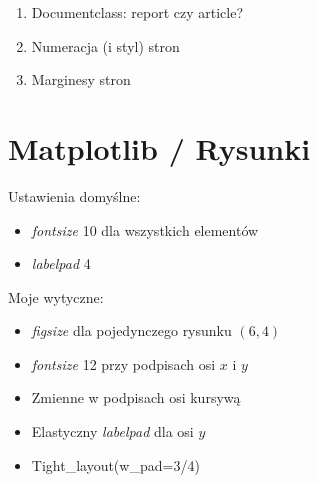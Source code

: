 \documentclass[12pt,a4paper,oneside]{book}
\theoremstyle{definition}
\begin{document}
\begin{enumerate}
\item Documentclass: report czy article?
\item Numeracja (i styl) stron
\item Marginesy stron
\end{enumerate}

\section{Matplotlib / Rysunki}

Ustawienia domyślne:
\begin{itemize}
	\item \textit{fontsize} 10 dla wszystkich elementów
	\item \textit{labelpad} 4
\end{itemize}
Moje wytyczne:
\begin{itemize}
	\item \textit{figsize} dla pojedynczego rysunku $(6, 4)$
	\item \textit{fontsize} 12 przy podpisach osi $x$ i $y$
	\item Zmienne w podpisach osi kursywą
	\item Elastyczny \textit{labelpad} dla osi $y$
	\item Tight\_layout(w\_pad=3/4)
\end{itemize}

\newpage
{}


\end{document}
